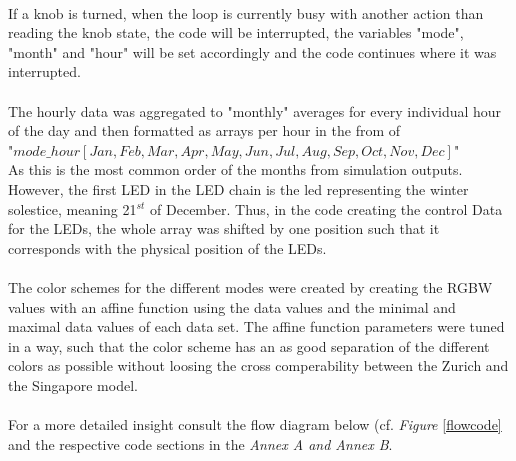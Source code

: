 \documentclass[a4paper,9pt]{article}
\begin{document}
\begin{multicols}{2}
    \\
    If a knob is turned, when the loop is currently busy with another action than reading the knob state, the code will be interrupted, the variables "mode", "month" and "hour" will be set accordingly and the code continues where it was interrupted.\\
    \\
    The hourly data was aggregated to "monthly" averages for every individual hour of the day and then formatted as arrays per hour in the from of\\ "{\tiny$mode\_hour[Jan, Feb, Mar, Apr, May, Jun, Jul, Aug, Sep, Oct, Nov, Dec]$}"\\ As this is the most common order of the months from simulation outputs. However, the first LED in the LED chain is the led representing the winter solestice, meaning 21$^{st}$ of December. Thus, in the code creating the control Data for the LEDs, the whole array was shifted by one position such that it corresponds with the physical position of the LEDs.\\
    \\
    The color schemes for the different modes were created by creating the RGBW values with an affine function using the data values and the minimal and maximal data values of each data set. The affine function parameters were tuned in a way, such that the color scheme has an as good separation of the different colors as possible without loosing the cross comperability between the Zurich and the Singapore model.\\
    \\
    For a more detailed insight consult the flow diagram below (cf. \textit{Figure} \ref{flowcode} and the respective code sections in the \textit{Annex A and Annex B}.
    
\end{multicols}
\end{document}
